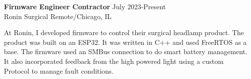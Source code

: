 \textbf{Firmware Engineer Contractor} \hfill July 2023-Present \\
Ronin Surgical \hfill Remote/Chicago, IL
\begin{description} \itemsep -2pt %
\item At Ronin, I developed firmware to control their surgical headlamp product.
The product was built on an ESP32. It was written in C++ and used FreeRTOS as a
base. The firmware used an SMBus connection to do smart battery management. It
also incorporated feedback from the high powered light using a custom Protocol
to manage fault conditions.
\end{description}
